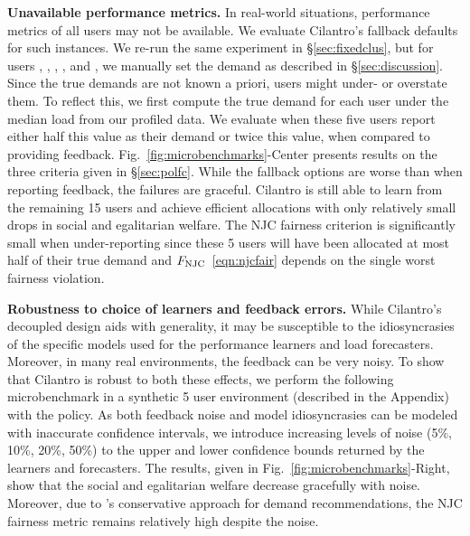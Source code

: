 \textbf{Unavailable performance metrics.}
In real-world situations, performance metrics of all users may not be available.
We evaluate Cilantro's fallback defaults for
such instances.
We re-run the same experiment in \S\ref{sec:fixedclus}, but for users
, , , , and , we manually set
the demand as described in \S\ref{sec:discussion}.
Since the true demands are not known a priori, users might under- or overstate them.
To reflect this, we first
compute the true demand for each user under the median load from our profiled data.
We evaluate \cilantronjcs when these five users report either half this value as their demand or twice this value, when compared to providing feedback.
Fig.~\ref{fig:microbenchmarks}-Center presents results %
on the three criteria given in \S\ref{sec:polfc}.
While the fallback options are worse than when reporting feedback,
the failures are graceful.
Cilantro is still able to learn
from the remaining 15 users and achieve efficient allocations with only relatively small
drops in social and egalitarian welfare.
The NJC fairness criterion is significantly small when under-reporting since these 5
users will have been allocated at most half of their true demand and $F_{\rm NJC}$~\eqref{eqn:njcfair} depends on the single worst fairness violation.

\textbf{Robustness to choice of learners and feedback errors.}
While Cilantro's decoupled design aids with generality, it may be susceptible to the idiosyncrasies
of the specific models used for the performance learners and load forecasters.
Moreover, in many real environments, the feedback can be very noisy.
To show that Cilantro is robust to both these effects, we perform the following
microbenchmark in a synthetic 5 user environment (described in the Appendix) with the
\cilantronjcs policy.
As both feedback noise and model idiosyncrasies can be modeled with inaccurate confidence intervals,
we introduce increasing levels of noise (5\%, 10\%, 20\%, 50\%) to the 
upper and lower confidence bounds returned by the learners and forecasters.
The results, given in Fig.~\ref{fig:microbenchmarks}-Right, show that the social and egalitarian
welfare decrease gracefully with noise.
Moreover, due to \cilantronjc's conservative approach for demand recommendations, the NJC fairness
metric remains relatively high despite the noise.



